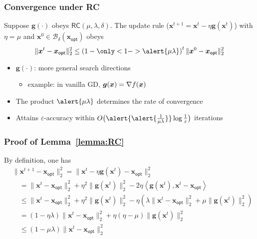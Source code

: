 \documentclass[compress,
mathserif,wide,%
]{beamer}
\begin{document}
\begin{frame}

\frametitle{Convergence  under RC}

 \begin{lemma}\label{lemma:RC}
 Suppose $\bm{g}(\cdot)$ obeys $\mathsf{RC}( \mu,\lambda, \delta )$. The update rule ($\bm{x}^{t+1} = \bm{x}^t - \eta \bm{g}(\bm{x}^t)$) with $\eta = \mu$  and $\bm{x}^{0} \in \mathcal{B}_{\delta}(\bm{x}_{\mathsf{opt}})$ obeys
	\[
		\|\bm{x}^{t} -\bm{x}_{\mathsf{opt}} \|_2^{2} \leq \left(1- \only<1->{\alert{\mu\lambda}} \right)^{t} \|\bm{x}^{0} -\bm{x}_{\mathsf{opt}} \|_2^{2}
	\]
 \end{lemma}


\vfill
\begin{itemize}
	\itemsep0.5em
	\item $\bm{g}(\cdot)$: more general search directions
	\begin{itemize}
		\item example: in vanilla GD, $\bm{g}({\bm x})=\nabla f({\bm x})$
	\end{itemize}
	\item The product $\alert{\mu\lambda}$ determines the rate of convergence
	\item Attains $\varepsilon$-accuracy within $O\big( \alert{ \alert{\frac{1}{\mu\lambda}}} \log\frac{1}{\varepsilon} \big)$ iterations
\end{itemize}


\end{frame}


\begin{frame}
	\frametitle{Proof of Lemma~\ref{lemma:RC}}
	By definition, one has
	\begin{align*}
&\|\bm{x}^{t+1}-\bm{x}_{\mathsf{opt}}\|_{2}^{2} =\|\bm{x}^{t}-\eta\bm{g}(\bm{x}^{t})-\bm{x}_{\mathsf{opt}}\|_{2}^{2}\\
 &\quad =\|\bm{x}^{t}-\bm{x}_{\mathsf{opt}}\|_{2}^{2}+\eta^{2}\|\bm{g}(\bm{x}^{t})\|_{2}^{2}-2\eta\left\langle \bm{g}(\bm{x}^{t}),\bm{x}^{t}-\bm{x}_{\mathsf{opt}}\right\rangle \\
 &\quad \leq\|\bm{x}^{t}-\bm{x}_{\mathsf{opt}}\|_{2}^{2}+\eta^{2}\|\bm{g}(\bm{x}^{t})\|_{2}^{2}-\eta\left(\lambda\|\bm{x}^{t}-\bm{x}_{\mathsf{opt}}\|_{2}^{2}+\mu\|\bm{g}(\bm{x}^{t})\|_{2}^{2}\right)\\
 &\quad =(1-\eta\lambda)\|\bm{x}^{t}-\bm{x}_{\mathsf{opt}}\|_{2}^{2}+\eta(\eta-\mu)\|\bm{g}(\bm{x}^{t})\|_{2}^{2}\\
 &\quad \leq(1-\mu \lambda)\|\bm{x}^{t}-\bm{x}_{\mathsf{opt}}\|_{2}^{2}
\end{align*}
\end{frame}
\end{document}
